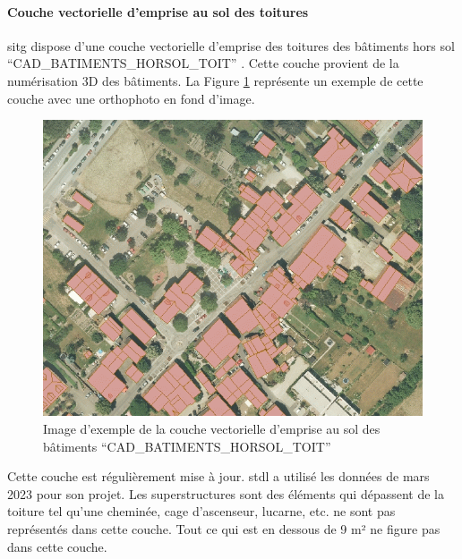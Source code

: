 {\paragraph{Couche vectorielle d'emprise au sol des toitures}
\par{\acrshort{sitg} dispose d'une couche vectorielle d'emprise des toitures des bâtiments hors sol ``CAD\_BATIMENTS\_HORSOL\_TOIT'' \cite{sitg_toits_nodate}. Cette couche provient de la numérisation 3D des bâtiments. La Figure \ref{fig:stdl_01_couche_vectorielle} représente un exemple de cette couche avec une orthophoto en fond d'image.}
\begin{figure}[H]
    \centering
    \includegraphics[width=1\linewidth]{02-main//figures/stdl_01_couche_vectorielle.png}
    \caption{Image d’exemple de la couche vectorielle d’emprise au sol des bâtiments ``CAD\_BATIMENTS\_HORSOL\_TOIT'' \cite{sitg_toits_nodate}}
    \label{fig:stdl_01_couche_vectorielle}
\end{figure}
\par{Cette couche est régulièrement mise à jour. \acrshort{stdl} a utilisé les données de mars 2023 pour son projet. Les superstructures sont des éléments qui dépassent de la toiture tel qu'une cheminée, cage d'ascenseur, lucarne, etc. ne sont pas représentés dans cette couche. Tout ce qui est en dessous de 9 m² ne figure pas dans cette couche.}

}

